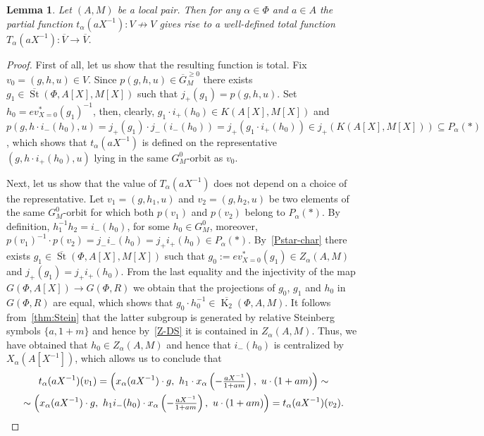 \documentclass[oneside, 8pt]{amsart}
\newtheorem{lemma}{Lemma}
\theoremstyle{remark}
\theoremstyle{definition}
\numberwithin{lemma}{section}
\numberwithin{prop}{section}
\numberwithin{corollary}{section}
\numberwithin{externaltheorem}{section}
\DeclareMathOperator{\St}{St}
\DeclareMathOperator{\K}{K}
\numberwithin{equation}{section}
\begin{document}
\begin{lemma}\label{lem:orbit-action} Let $(A, M)$ be a local pair. 
Then for any $\alpha \in \Phi$ and $a \in A$ the partial function $t_\alpha(aX^{-1}) \colon V \not \to V$ gives rise to a well-defined total function $T_\alpha(aX^{-1}) \colon \overline{V} \to \overline{V}$. \end{lemma}
\begin{proof}
 First of all, let us show that the resulting function is total. 
 Fix $v_0 = (g, h, u) \in V$. Since $p(g, h, u) \in \overline{G}^{\geq 0}_M$ there exists $g_1 \in \overline{\St}(\Phi, A[X], M[X])$ such that $j_+(g_1) = p(g, h, u).$
 Set $h_0 = ev^*_{X=0}(g_1)^{-1}$, then, clearly, $g_1 \cdot i_+(h_0) \in K(A[X], M[X])$ and 
 $p(g, h \cdot i_-(h_0), u) = j_+(g_1) \cdot j_-(i_-(h_0)) = j_+(g_1 \cdot i_+(h_0)) \in j_+(K(A[X], M[X])) \subseteq P_\alpha(*)$, which shows that $t_\alpha(aX^{-1})$ is defined on the representative $(g, h \cdot i_+(h_0), u)$ lying in the same $G_M^0$-orbit as $v_0$.
  
 Next, let us show that the value of $T_\alpha(aX^{-1})$ does not depend on a choice of the representative.
 Let $v_1 = (g, h_1, u)$ and $v_2 = (g, h_2, u)$ be two elements of the same $G_M^0$-orbit for which both $p(v_1)$ and $p(v_2)$ belong to $P_\alpha(*)$.
 By definition, $h_1^{-1} h_2 = i_-(h_0)$, for some $h_0 \in G^0_M$, moreover, 
  $p(v_1)^{-1} \cdot p(v_2) = j_- i_-(h_0) = j_+ i_+(h_0) \in P_\alpha(*)$.
 By~\cref{Pstar-char} there exists $g_1 \in \overline{\St}(\Phi, A[X], M[X])$ such that $g_0 := ev^*_{X=0}(g_1) \in Z_\alpha(A, M)$ and $j_+(g_1) = j_+ i_+ (h_0)$.
 From the last equality and the injectivity of the map $G(\Phi, A[X]) \to G(\Phi, R)$ we obtain that the projections of $g_0$, $g_1$ and $h_0$ in $G(\Phi, R)$ are equal, which shows that $g_0 \cdot h_0^{-1} \in \overline{\K_2}(\Phi, A, M)$. It follows from~\cref{thm:Stein} that the latter subgroup is generated by relative Steinberg symbols $\{ a, 1 + m \}$ and hence by~\cref{Z-DS} it is contained in $Z_\alpha(A, M)$. Thus, we have obtained that $h_0 \in Z_\alpha(A, M)$ and hence that $i_-(h_0)$ is centralized by $X_\alpha(A[X^{-1}])$, which allows us to conclude that
 \begin{multline} \nonumber
  t_\alpha(aX^{-1})(v_1) = \left( x_\alpha(aX^{-1})\cdot g ,\ h_1 \cdot x_\alpha\left(-\tfrac{aX^{-1}}{1 + am}\right),\ u \cdot (1 + am)\right) \sim \\
  \sim \left( x_\alpha(aX^{-1})\cdot g ,\ h_1 i_-(h_0) \cdot x_\alpha\left(-\tfrac{aX^{-1}}{1 + am}\right),\ u \cdot (1 + am)\right) = t_\alpha(aX^{-1})(v_2). \qedhere
 \end{multline} \end{proof}
\end{document}
